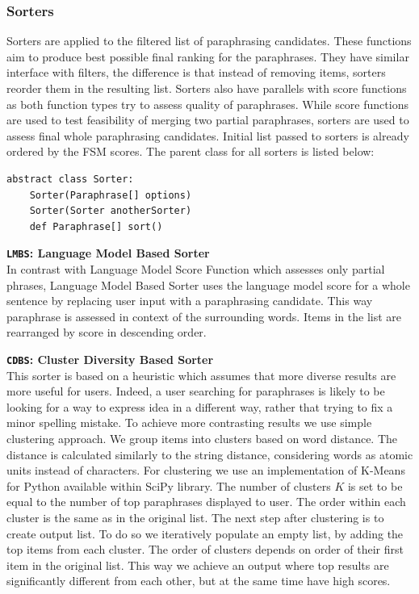 \subsubsection{Sorters}

Sorters are applied to the filtered list of paraphrasing candidates. These functions aim to produce best possible final ranking for the paraphrases. They have similar interface with filters, the difference is that instead of removing items, sorters reorder them in the resulting list. Sorters also have parallels with score functions as both function types try to assess quality of paraphrases. While score functions are used to test feasibility of merging two partial paraphrases, sorters are used to assess final whole paraphrasing candidates. Initial list passed to sorters is already ordered by the FSM scores. The parent class for all sorters is listed below:

\begin{verbatim}
abstract class Sorter:
    Sorter(Paraphrase[] options)
    Sorter(Sorter anotherSorter)
    def Paraphrase[] sort()
\end{verbatim}


\begin{flushleft}

\textbf{\texttt{LMBS}: \textbf{Language Model Based Sorter}} \\
In contrast with Language Model Score Function which assesses only partial phrases, Language Model Based Sorter uses the language model score for a whole sentence by replacing user input with a paraphrasing candidate. This way paraphrase is assessed in context of the surrounding words. Items in the list are rearranged by score in descending order. 
\bigskip

\textbf{\texttt{CDBS}: \textbf{Cluster Diversity Based Sorter}} \\
This sorter is based on a heuristic which assumes that more diverse results are more useful for users. Indeed, a user searching for paraphrases is likely to be looking for a way to express idea in a different way, rather that trying to fix a minor spelling mistake. To achieve more contrasting results we use simple clustering approach. We group items into clusters based on word distance. The distance is calculated similarly to the string distance, considering words as atomic units instead of characters. For clustering we use an implementation of K-Means for Python available within SciPy library. The number of clusters $K$ is set to be equal to the number of top paraphrases displayed to user. The order within each cluster is the same as in the original list. The next step after clustering is to create output list. To do so we iteratively populate an empty list, by adding the top items from each cluster. The order of clusters depends on order of their first item in the original list. This way we achieve an output where top results are significantly different from each other, but at the same time have high scores.
\bigskip

\end{flushleft}


